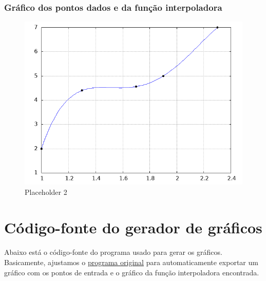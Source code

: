 \documentclass{article}
\begin{document}
                \subsubsection{Gráfico dos pontos dados e da função interpoladora}
                    \begin{figure}[H]
                        \centering
                        \includegraphics[width=0.5\linewidth]{saida.png}
                        \caption{Placeholder 2}
                        \label{fig:placeholder3}
                    \end{figure}

\newpage
\section{Código-fonte do gerador de gráficos}
\paragraph{} Abaixo está o código-fonte do programa usado para gerar os gráficos. Basicamente, ajustamos o \hyperref[sec:codigofonte1]{programa original} para automaticamente exportar um gráfico com os pontos de entrada e o gráfico da função interpoladora encontrada.


\end{document}
